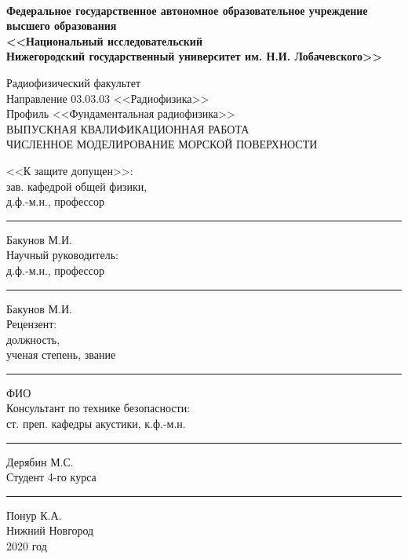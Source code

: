 \documentclass[a4paper,14pt]{extarticle}
\begin{document}
\begin{titlepage}
\begin{spacing}{1}
	\fontsize{11pt}{11pt} \selectfont
	{\centering
	\linespread{1}
	\\[13pt]
	\begin{spacing}{1.5}
		{\fontsize{12pt}{12pt} \selectfont\bf  Федеральное государственное автономное образовательное учреждение \\[-0.27em]
		высшего образования \\[-0.3em]
		<<Национальный исследовательский \\[-0.72em] Нижегородский
		государственный университет им. Н.И. Лобачевского>>
		}\\[4.5pt] 
	\end{spacing}
	\fontsize{12pt}{12pt} \selectfont
	Радиофизический факультет\\[16pt]
	Направление 03.03.03 <<Радиофизика>>\\[5pt]
	Профиль <<Фундаментальная радиофизика>>\\
	\vspace{30pt}
	ВЫПУСКНАЯ КВАЛИФИКАЦИОННАЯ РАБОТА\\
	\vspace{34pt}
	{{
            ЧИСЛЕННОЕ МОДЕЛИРОВАНИЕ МОРСКОЙ ПОВЕРХНОСТИ
	}}\\
	\vspace{34pt}}\fontsize{12pt}{12pt} \selectfont
	\noindent <<К защите допущен>>:\\[15pt]
	зав. кафедрой общей физики,\\[0.4em]
	д.ф.-м.н., профессор\hfill \rule{2cm}{1pt} Бакунов М.И. \hphantom{a\!a}\\[15pt]
	Научный руководитель:\\[0.4em]
	д.ф.-м.н., профессор\hfill \rule{2cm}{1pt} Бакунов М.И. \hphantom{a\!a}\\[15pt]
	Рецензент:\\[0.4em]
	должность,\\[0.4em] ученая степень, звание\hfill \rule{2cm}{1pt} ФИО\hphantom{aaaaaaaaaa,}\\[30pt]
	Консультант по технике безопасности:\\[0.4em]
	ст. преп. кафедры акустики, к.ф.-м.н.\hfill \rule{2cm}{1pt} Дерябин М.С.\hphantom{aa,}\\[15pt]
	Студент 4-го курса \hfill \rule{2cm}{1pt} Понур К.А.
    \hphantom{\,\,\,aaa}\\[15pt]
	\vfill
	\centering
	Нижний Новгород\\[0.4em]
	2020 год
\end{spacing}

\end{titlepage}
\clearpage
\restoregeometry
\end{document}
